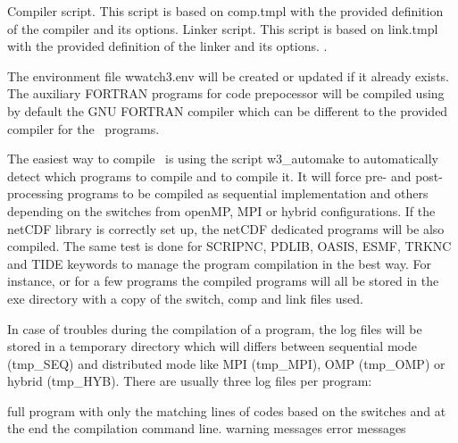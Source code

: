 \begin{flist}
  {Compiler script. This script is based on {\file comp.tmpl} with
	    the provided definition of the compiler and its options.}
  {Linker script. This script is based on {\file link.tmpl} with
	    the provided definition of the linker and its options.}
.
\end{flist}

\vspace{\baselineskip}

The environment file {\file wwatch3.env} will be created or updated if it 
already exists. The auxiliary FORTRAN programs for code prepocessor will be
compiled using by default the GNU FORTRAN compiler which can be different to
the provided compiler for the \ws\ programs.


\vspace{\baselineskip} \noindent 
The easiest way to compile \ws\ is using the script {\file w3\_automake} to 
automatically detect which programs to compile and to compile it. It will
force pre- and post-processing programs to be compiled as sequential 
implementation and others depending on the switches from openMP, MPI or hybrid
configurations. If the netCDF library is correctly set up, the netCDF dedicated
programs will be also compiled. The same test is done for SCRIPNC, PDLIB, OASIS,
ESMF, TRKNC and TIDE keywords to manage the program compilation in the best way.
For instance,  or for a few programs  the compiled programs will all be stored in the 
{\dir exe} directory with a copy of the switch, comp and link files used.

\vspace{\baselineskip} \noindent
In case of troubles during the compilation of a program, the log files will be
stored in a temporary directory which will differs between sequential mode
({\dir tmp\_SEQ}) and distributed mode like MPI ({\dir tmp\_MPI}), OMP 
({\dir tmp\_OMP}) or hybrid ({\dir tmp\_HYB}). There are usually three log files
per program:

\begin{flist}
 {full program with only the matching lines
	of codes based on the switches and at the end the compilation command line.}
	 {warning messages}
	 {error messages}
\end{flist}

